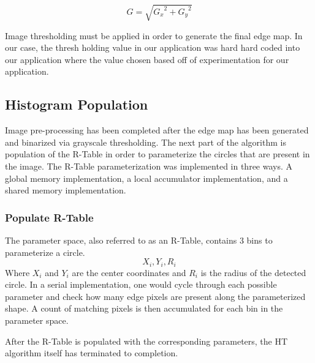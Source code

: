 \documentclass[conference]{IEEEtran}
\begin{document}
\begin{equation}
  G = \sqrt{{G_x}^2 + {G_y}^2}\label{equation:gradientMagnitude}
\end{equation}

Image thresholding must be applied in order to generate the final edge map.
In our case, the thresh holding value in our application was hard hard coded into our application where the value chosen based off of experimentation for our application.


\subsection{Histogram Population}
Image pre-processing has been completed after the edge map has been generated and binarized via grayscale thresholding.
The next part of the algorithm is population of the R-Table in order to parameterize the circles that are present in the image.
The R-Table parameterization was implemented in three ways. A global memory implementation, a local accumulator implementation, and a shared memory implementation.
\subsubsection{Populate R-Table}
The parameter space, also referred to as an R-Table, contains 3 bins to parameterize a circle.
\begin{equation}
  X_{i}, Y_{i}, R_{i}\label{circle-parameters}
\end{equation}
Where $X_i$ and $Y_i$ are the center coordinates and $R_i$ is the radius of the detected circle.
In a serial implementation, one would cycle through each possible parameter and check how many edge pixels are present along the parameterized shape. 
A count of matching pixels is then accumulated for each bin in the parameter space.


After the R-Table is populated with the corresponding parameters, the HT algorithm itself has terminated to completion. 
\end{document}
